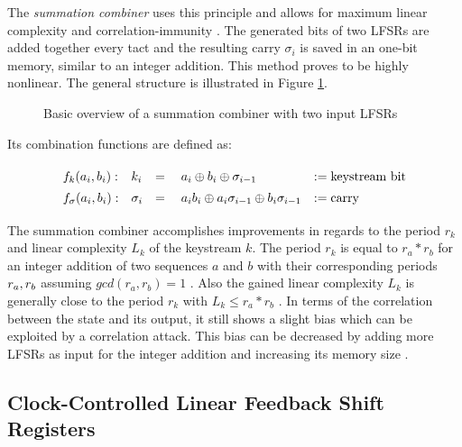 The \emph{summation combiner} uses this principle and allows for maximum linear complexity and correlation-immunity \cite[p. 261]{Rueppel.1986b}. The generated bits of two LFSRs are added together every tact and the resulting carry $\sigma_i$ is saved in an one-bit memory, similar to an integer addition. This method proves to be highly nonlinear. The general structure is illustrated in Figure \ref{fig:summation-combiner}. \cite[p. 70]{Meier.1992} \\

\begin{figure}[htbp]
	\centering
	\caption{Basic overview of a summation combiner with two input LFSRs}
	\label{fig:summation-combiner}
\end{figure}

\vspace{0,7cm}

Its combination functions are defined as:

\[\def\arraystretch{1.4}\begin{array}{llll}
	f_k(a_i, b_i): & k_i &= \quad a_i \oplus b_i \oplus \sigma_{i-1} &:= \text{keystream bit}\\
	f_\sigma(a_i, b_i): & \sigma_{i} &= \quad a_ib_i \oplus a_i\sigma_{i-1} \oplus b_i\sigma_{i-1} &:= \text{carry}\\
\end{array}\]

\vspace{0,4cm}

The summation combiner accomplishes improvements in regards to the period $r_k$ and linear complexity $L_k$ of the keystream $k$. The period $r_k$ is equal to $r_a*r_b$ for an integer addition of two sequences $a$ and $b$ with their corresponding periods $r_a, \space r_b$ assuming $gcd(r_a,r_b)=1$ \cite[p. 220]{Rueppel.1986}. Also the gained linear complexity $L_k$ is generally close to the period $r_k$ with $L_k \leq r_a*r_b$ \cite[p. 225]{Rueppel.1986}. In terms of the correlation between the state and its output, it still shows a slight bias which can be exploited by a correlation attack. This bias can be decreased by adding more LFSRs as input for the integer addition and increasing its memory size \cite[pp. 81-82]{Meier.1992}. \\

\subsection{Clock-Controlled Linear Feedback Shift Registers}


